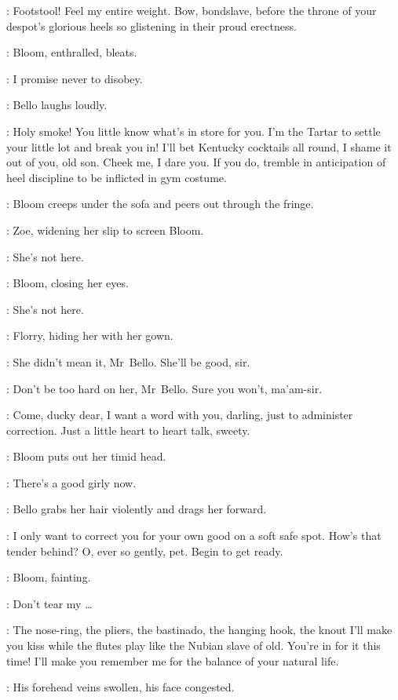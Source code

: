 \Bello:
Footstool!
Feel my entire weight.
Bow, bondslave, before the throne of your despot's glorious heels
so glistening in their proud erectness.

:
Bloom, enthralled, bleats.

\Bloom:
I promise never to disobey.

:
Bello laughs loudly.

\Bello:
Holy smoke!
You little know what's in store for you.
I'm the Tartar to settle your little lot and break you in!
I'll bet Kentucky cocktails all round, I shame it out of you, old son.
Cheek me, I dare you.
If you do, tremble in anticipation of heel discipline
to be inflicted in gym costume.%

:
Bloom creeps under the sofa and peers out through the fringe.

:
Zoe, widening her slip to screen Bloom.

\Zoe:
She's not here.

:
Bloom, closing her eyes.

\Bloom:
She's not here.

:
Florry, hiding her with her gown.

\Florry:
She didn't mean it, Mr~Bello.
She'll be good, sir.

\Kitty:
Don't be too hard on her, Mr~Bello.
Sure you won't, ma'am-sir.

\Bello:
Come, ducky dear, I want a word with you, darling,
just to administer correction.
Just a little heart to heart talk, sweety.

:
Bloom puts out her timid head.

\Bello:
There's a good girly now.

:
Bello grabs her hair violently and drags her forward.

\Bello:
I only want to correct you for your own good on a soft safe spot.
How's that tender behind?
O, ever so gently, pet.
Begin to get ready.

:
Bloom, fainting.

\Bloom:
Don't tear my \ldots

\Bello:
The nose-ring, the pliers, the bastinado, the hanging hook,
the knout I'll make you kiss while the flutes play like the Nubian slave of old.
You're in for it this time!
I'll make you remember me for the balance of your natural life.

:
His forehead veins swollen, his face congested.

